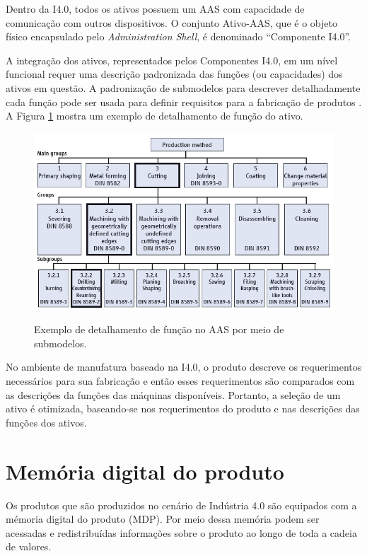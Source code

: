 \documentclass[
	12pt,				%
	oneside,			%
	a4paper,			%
	english,			%
	brazil				%
]{abntex2}
\begin{document}
	Dentro da I4.0, todos os ativos possuem um AAS com capacidade de comunicação com outros dispositivos. O conjunto Ativo-AAS, que é o objeto físico encapsulado pelo \textit{Administration Shell}, é denominado ``Componente I4.0''.
	
	A integração dos ativos, representados pelos Componentes I4.0, em um nível funcional requer uma descrição padronizada das funções (ou capacidades) dos ativos em questão. A padronização de submodelos para descrever detalhadamente cada função pode ser usada para definir requisitos para a fabricação de produtos \cite{bedenbender2017aasexamples}. A Figura \ref{fig:submodelos} mostra um exemplo de detalhamento de função do ativo.
	
	\begin{figure}[H]
		\centering
		\caption{Exemplo de detalhamento de função no AAS por meio de submodelos.}
		\includegraphics[width=1\textwidth]{submodelos.png}
		\label{fig:submodelos}
	\end{figure}

	No ambiente de manufatura baseado na I4.0, o produto descreve os requerimentos necessários para sua fabricação e então esses requerimentos são comparados com as descrições da funções das máquinas disponíveis. Portanto, a seleção de um ativo é otimizada, baseando-se nos requerimentos do produto e nas descrições das funções dos ativos.
	

	\section{Memória digital do produto}

	Os produtos que são produzidos no cenário de Indústria 4.0 são equipados com a mémoria digital do produto (MDP). Por meio dessa memória podem ser acessadas e redistribuídas informações sobre o produto ao longo de toda a cadeia de valores.
\end{document}
